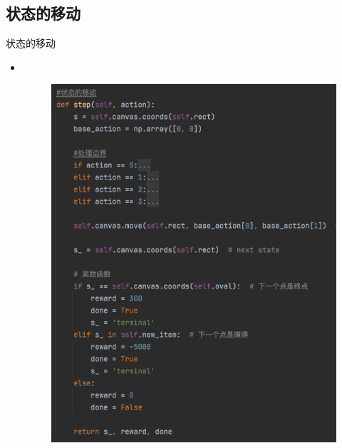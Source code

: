 \documentclass{beamer}
\begin{document}
\subsection{状态的移动 }
\begin{frame}{状态的移动}
    \begin{itemize}
    \tiny
    
    \item 
    \\
    
    \begin{minipage}{1\linewidth}
        \medskip
        \begin{figure}[h]
            \centering
            \includegraphics[height=.8\textheight]{pic/15.png}
        \end{figure}
    \end{minipage}
    \end{itemize}
    
\end{frame}
\end{document}

